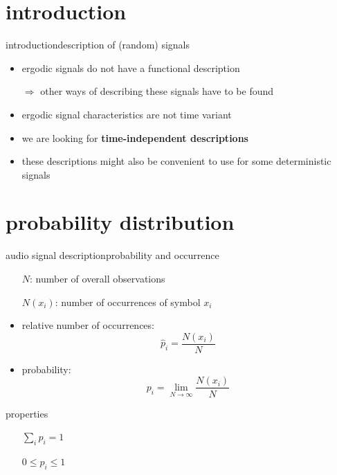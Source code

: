 


\subtitle{Part 4: Signal Description}


	

\section{introduction}
\begin{frame}{introduction}{description of (random) signals}
    \begin{itemize}
        \item   ergodic signals do not have a functional description
        \item[$\Rightarrow$]    other ways of describing these signals have to be found
        \bigskip
        \item<2->   ergodic signal characteristics are not time variant
        \item<2->[$\Rightarrow$]    we are looking for \textbf{time-independent descriptions}
        \bigskip
        \item<3-> these descriptions might also be convenient to use for some deterministic signals
    \end{itemize}
\end{frame}

\section{probability distribution}
\begin{frame}{audio signal description}{probability and occurrence}
	\begin{itemize}
		\item[]	$N$: number of overall observations
		\item[] $N(x_i)$: number of occurrences of symbol $x_i$
	\end{itemize}
	
	\pause
	\begin{itemize}
		\item	relative number of occurrences:
				\begin{equation*}
					\hat{p}_i = \frac{N(x_i)}{N}
				\end{equation*}
		
		\pause
		\item	probability:
				\begin{equation*}
					p_i = \lim\limits_{N\rightarrow\infty} \frac{N(x_i)}{N}
				\end{equation*}
	\end{itemize}
    \pause
    \begin{block}{properties}
        \begin{itemize}
            \item[]   $\sum\limits_i p_i = 1$
            \item[]   $0 \leq p_i \leq 1$
        \end{itemize}
    \end{block}
\end{frame}

